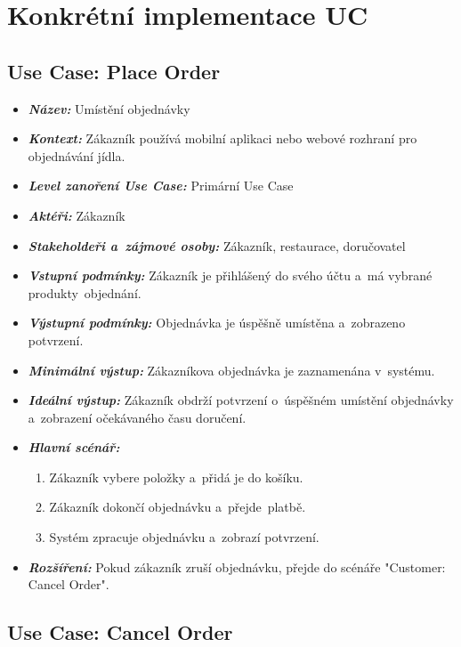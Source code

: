 \section{Konkrétní implementace UC}
\raggedright
\sloppy
    \subsection{Use Case: Place Order}

	\begin{itemize}[itemsep=0pt]
        \item \textbf{\textit{Název:}} Umístění objednávky
        \item \textbf{\textit{Kontext:}} Zákazník používá mobilní aplikaci nebo webové rozhraní pro objednávání jídla.
        \item \textbf{\textit{Level zanoření Use Case:}} Primární Use Case
    	\item \textbf{\textit{Aktéři:}} Zákazník
        \item \textbf{\textit{Stakeholdeři a~zájmové osoby:}} Zákazník, restaurace, doručovatel
        \item \textbf{\textit{Vstupní podmínky:}} Zákazník je přihlášený do svého účtu a~má vybrané produkty~objednání.
        \item \textbf{\textit{Výstupní podmínky:}} Objednávka je úspěšně umístěna a~zobrazeno potvrzení.
        \item \textbf{\textit{Minimální výstup:}} Zákazníkova objednávka je zaznamenána v~systému.
        \item \textbf{\textit{Ideální výstup:}} Zákazník obdrží potvrzení o~úspěšném umístění objednávky a~zobrazení očekávaného času doručení.
        \item \textbf{\textit{Hlavní scénář:}}
			\begin{enumerate}[topsep=0pt]
            	\item Zákazník vybere položky a~přidá je do košíku.
            	\item Zákazník dokončí objednávku a~přejde~platbě.
            	\item Systém zpracuje objednávku a~zobrazí potvrzení.
			\end{enumerate}
        \item \textbf{\textit{Rozšíření:}} Pokud zákazník zruší objednávku, přejde do scénáře "Customer: Cancel Order".
	\end{itemize}

    \subsection{Use Case: Cancel Order}
	
